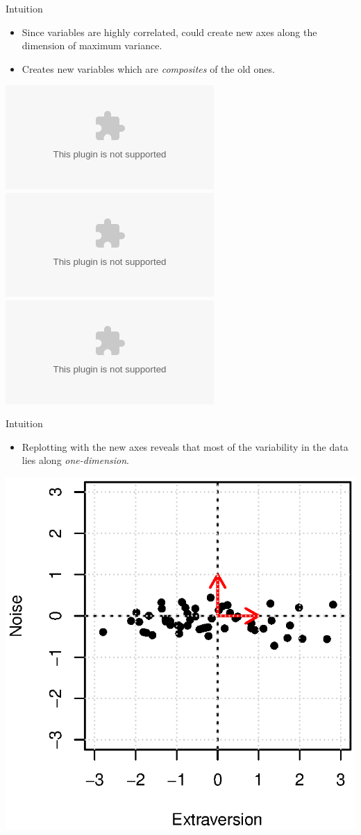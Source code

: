\documentclass{beamer}
\begin{document}
\begin{frame}{Intuition}
	\begin{minipage}{0.47\textwidth}
    		\begin{itemize}
        		\item Since variables are highly correlated, could create new axes along the 
					 dimension of maximum variance.
			\item Creates new variables which are \emph{composites} of the old ones.
    		\end{itemize}
	\end{minipage}
	\begin{minipage}{0.5\textwidth}
    		\begin{center}
        		\includegraphics<1>[scale=.6, left]{figures/pca1.eps}
			\includegraphics<2>[scale=.6, left]{figures/pca4.eps}
			\includegraphics<3>[scale=.6, left]{figures/pca5.eps}
    		\end{center}
	\end{minipage}
\end{frame}

\begin{frame}{Intuition}
	\begin{minipage}{0.47\textwidth}
    		\begin{itemize}
        		\item Replotting with the new axes reveals that most of the variability in the data 
				  lies along \emph{one-dimension}.
    		\end{itemize}
	\end{minipage}
	\begin{minipage}{0.5\textwidth}
    		\begin{center}
        		\includegraphics[scale=.6, left]{figures/pca6.eps}
    		\end{center}
	\end{minipage}
\end{frame}
\end{document}
